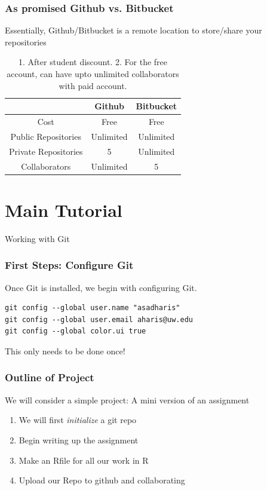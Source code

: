 \documentclass{beamer}
\begin{document}
\begin{frame}
\frametitle{As promised Github vs. Bitbucket}
Essentially, Github/Bitbucket is a remote location to store/share your repositories


\begin{table}
\centering

\begin{tabular}{c|cc}
\hline
 & Github & Bitbucket\\
\hline
Cost & Free & Free\\
Public Repositories & Unlimited & Unlimited\\
Private Repositories & 5\footnote[1] & Unlimited\\
Collaborators & Unlimited & 5\footnote[2] \\
\end{tabular}
\caption{1. After student discount. 2. For the free account, can have upto unlimited collaborators with paid account.}
\end{table}

\end{frame}



\section{Main Tutorial}

\begin{frame}
\centering
\Large Working with Git
\end{frame}

\begin{frame}[fragile]
\frametitle{First Steps: Configure Git}
Once Git is installed, we begin with configuring Git. 

\begin{verbatim}
git config --global user.name "asadharis"
git config --global user.email aharis@uw.edu
git config --global color.ui true
\end{verbatim}

This only needs to be done once!
\end{frame}

\begin{frame}
\frametitle{Outline of Project}
We will consider a simple project: A mini version of an assignment
\begin{enumerate}[1.]
\item We will first \textit{initialize} a git repo
\item Begin writing up the assignment
\item Make an Rfile for all our work in R
\item Upload our Repo to github and collaborating
\end{enumerate} 
\end{frame}
\end{document}
